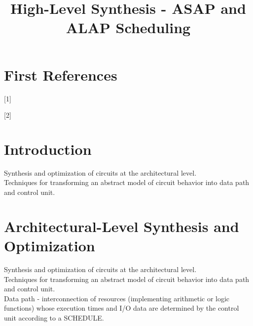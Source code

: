 \documentclass[conference]{IEEEtran}
\begin{document}
\title{High-Level Synthesis - ASAP and ALAP Scheduling\\
}

\author{

}

\maketitle

\begin{abstract}

\end{abstract}

\begin{IEEEkeywords}

\end{IEEEkeywords}

\section{First References}
[1]\cite{} 

[2]\cite{}

\section{Introduction}
Synthesis and optimization of circuits at the architectural level.\\

Techniques for transforming an abstract model of circuit behavior into data path and control unit.\\
\section{Architectural-Level Synthesis and Optimization}


Synthesis and optimization of circuits at the architectural level.\\

Techniques for transforming an abstract model of circuit behavior into data path and control unit.\\

Data path - interconnection of resources (implementing arithmetic or logic functions) whose execution times and I/O data are determined by the control unit according to a SCHEDULE.\\
\end{document}
